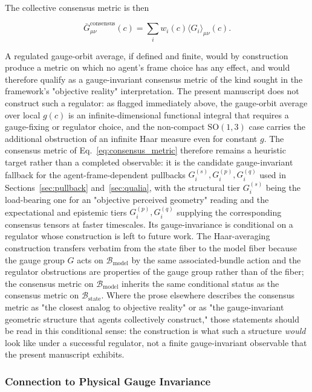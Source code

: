 \documentclass[11pt]{article}
\begin{document}
The collective consensus metric is then

\begin{equation}
\bar{G}_{\mu\nu}^{\text{consensus}}(c) = \sum_i w_i(c) \langle G_i \rangle_{\mu\nu}(c).
\label{eq:consensus_metric}
\end{equation}

A regulated gauge-orbit average, if defined and finite, would by construction produce a metric on which no agent's frame choice has any effect, and would therefore qualify as a gauge-invariant consensus metric of the kind sought in the framework's "objective reality" interpretation. The present manuscript does not construct such a regulator: as flagged immediately above, the gauge-orbit average over local $g(c)$ is an infinite-dimensional functional integral that requires a gauge-fixing or regulator choice, and the non-compact $\mathrm{SO}(1,3)$ case carries the additional obstruction of an infinite Haar measure even for constant $g$. The consensus metric of Eq.~\eqref{eq:consensus_metric} therefore remains a heuristic target rather than a completed observable: it is the candidate gauge-invariant fallback for the agent-frame-dependent pullbacks $G_i^{(s)}, G_i^{(p)}, G_i^{(q)}$ used in Sections~\ref{sec:pullback} and~\ref{sec:qualia}, with the structural tier $G_i^{(s)}$ being the load-bearing one for an "objective perceived geometry" reading and the expectational and epistemic tiers $G_i^{(p)}, G_i^{(q)}$ supplying the corresponding consensus tensors at faster timescales. Its gauge-invariance is conditional on a regulator whose construction is left to future work. The Haar-averaging construction transfers verbatim from the state fiber to the model fiber because the gauge group $G$ acts on $\mathcal{B}_{\mathrm{model}}$ by the same associated-bundle action and the regulator obstructions are properties of the gauge group rather than of the fiber; the consensus metric on $\mathcal{B}_{\mathrm{model}}$ inherits the same conditional status as the consensus metric on $\mathcal{B}_{\mathrm{state}}$. Where the prose elsewhere describes the consensus metric as "the closest analog to objective reality" or as "the gauge-invariant geometric structure that agents collectively construct," those statements should be read in this conditional sense: the construction is what such a structure \emph{would} look like under a successful regulator, not a finite gauge-invariant observable that the present manuscript exhibits.

\subsubsection{Connection to Physical Gauge Invariance}
\end{document}
